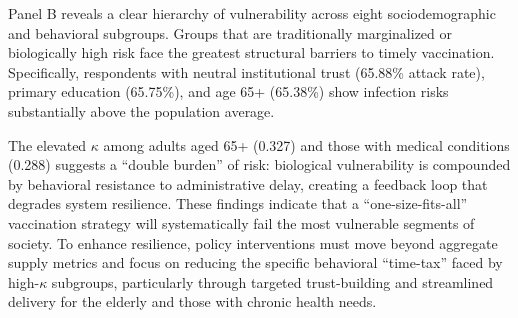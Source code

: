 Panel B reveals a clear hierarchy of vulnerability across eight sociodemographic and behavioral subgroups. Groups that are traditionally marginalized or biologically high risk face the greatest structural barriers to timely vaccination. Specifically, respondents with neutral institutional trust (65.88\% attack rate), primary education (65.75\%), and age 65+ (65.38\%) show infection risks substantially above the population average. 

The elevated $\kappa$ among adults aged 65+ (0.327) and those with medical conditions (0.288) suggests a ``double burden'' of risk: biological vulnerability is compounded by behavioral resistance to administrative delay, creating a feedback loop that degrades system resilience. These findings indicate that a ``one-size-fits-all'' vaccination strategy will systematically fail the most vulnerable segments of society. To enhance resilience, policy interventions must move beyond aggregate supply metrics and focus on reducing the specific behavioral ``time-tax'' faced by high-$\kappa$ subgroups, particularly through targeted trust-building and streamlined delivery for the elderly and those with chronic health needs.
